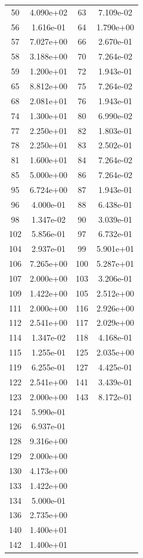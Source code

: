 \documentclass[12pt]{article}
\begin{document}
\begin{longtable}{@{}cccc@{}}
50 & 4.090e+02 & 63 & 7.109e-02 \\
56 & 1.616e-01 & 64 & 1.790e+00 \\
57 & 7.027e+00 & 66 & 2.670e-01 \\
58 & 3.188e+00 & 70 & 7.264e-02 \\
59 & 1.200e+01 & 72 & 1.943e-01 \\
65 & 8.812e+00 & 75 & 7.264e-02 \\
68 & 2.081e+01 & 76 & 1.943e-01 \\
74 & 1.300e+01 & 80 & 6.990e-02 \\
77 & 2.250e+01 & 82 & 1.803e-01 \\
78 & 2.250e+01 & 83 & 2.502e-01 \\
81 & 1.600e+01 & 84 & 7.264e-02 \\
85 & 5.000e+00 & 86 & 7.264e-02 \\
95 & 6.724e+00 & 87 & 1.943e-01 \\
96 & 4.000e-01 & 88 & 6.438e-01 \\
98 & 1.347e-02 & 90 & 3.039e-01 \\
102 & 5.856e-01 & 97 & 6.732e-01 \\
104 & 2.937e-01 & 99 & 5.901e+01 \\
106 & 7.265e+00 & 100 & 5.287e+01 \\
107 & 2.000e+00 & 103 & 3.206e-01 \\
109 & 1.422e+00 & 105 & 2.512e+00 \\
111 & 2.000e+00 & 116 & 2.926e+00 \\
112 & 2.541e+00 & 117 & 2.029e+00 \\
114 & 1.347e-02 & 118 & 4.168e-01 \\
115 & 1.255e-01 & 125 & 2.035e+00 \\
119 & 6.255e-01 & 127 & 4.425e-01 \\
122 & 2.541e+00 & 141 & 3.439e-01 \\
123 & 2.000e+00 & 143 & 8.172e-01 \\
124 & 5.990e-01 &  &  \\
126 & 6.937e-01 &  &  \\
128 & 9.316e+00 &  &  \\
129 & 2.000e+00 &  &  \\
130 & 4.173e+00 &  &  \\
133 & 1.422e+00 &  &  \\
134 & 5.000e-01 &  &  \\
136 & 2.735e+00 &  &  \\
140 & 1.400e+01 &  &  \\
142 & 1.400e+01 &  &  \\

\bottomrule
\end{longtable}
\end{document}
